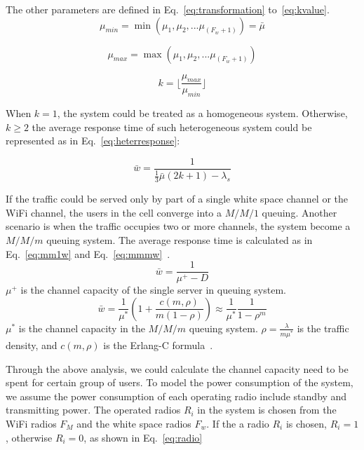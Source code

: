 The other parameters are defined in Eq.~\ref{eq:transformation} to~\ref{eq:kvalue}.
\begin{equation}
\label{eq:transformation}
\mu_{min}=\min{(\mu_1,\mu_2,...\mu_{(F_w+1)})} = \bar{\mu}
\end{equation}

\begin{equation}
\mu_{max}=\max{(\mu_1,\mu_2,...\mu_{(F_w+1)})} 
\end{equation}

\begin{equation}
\label{eq:kvalue}
k= \lfloor\frac{\mu_{max}}{\mu_{min}} \rfloor
\end{equation}

When $k=1$, the system could be treated as a homogeneous system. Otherwise,   
$k\ge2$ the average response time of such heterogeneous system could be represented as in Eq.~\ref{eq:heterresponse}\cite{yu2008transformation}:

\begin{equation}
\label{eq:heterresponse}
\bar{w}=\frac{1}{\frac{1}{3}\bar{\mu}(2k+1)-\lambda_s}
\end{equation}

If the traffic could be served only by part of a single white space channel or the WiFi channel, the users in the cell 
converge into a $M/M/1$ queuing. Another scenario is when the traffic occupies two or more channels, the system become 
a $M/M/m$ queuing system. The average response time is calculated as in Eq.~\ref{eq:mm1w} and Eq.~\ref{eq:mmmw}~\cite{gelenbe1998introduction}.
\begin{equation}
\label{eq:mm1w}
\bar{w}=\frac{1}{\mu^+-D}
\end{equation}
$\mu^+$ is the channel capacity of the single server in queuing system.
\begin{equation}
\label{eq:mmmw}
\bar{w} = \frac{1}{\mu^*}(1+\frac{c(m,\rho)}{m(1-\rho)})\approx \frac{1}{\mu^*}\frac{1}{1-\rho^m}
\end{equation}
$\mu^*$ is the channel capacity in the $M/M/m$ queuing system.
$\rho=\frac{\lambda}{m\mu^*}$ is the traffic density, and $c(m,\rho)$ is the Erlang-C formula~\cite{gelenbe1998introduction}.

Through the above analysis, we could calculate the channel capacity need to be spent for certain group of users. 
To model the power consumption of the system, we assume the power consumption of each operating radio include 
standby and transmitting power.
The operated radios $R_i$ in the system is chosen from the WiFi radios $F_M$ and the white space radios $F_w$. 
If the a radio $R_i$ is chosen, $R_i = 1$, otherwise $R_i = 0$, as shown in Eq.~\ref{eq:radio}

